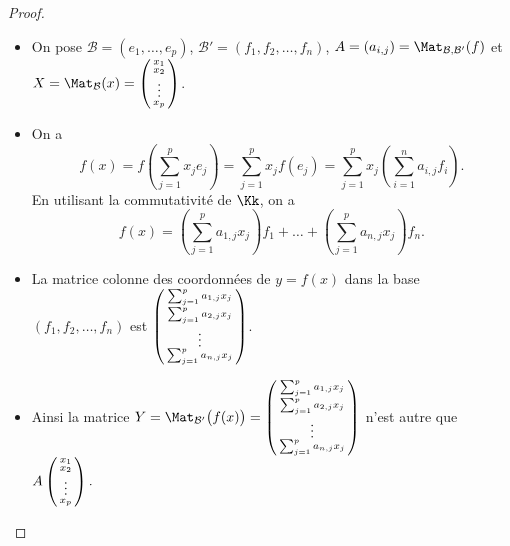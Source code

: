 \documentclass[class=report,crop=false]{standalone}
\begin{document}
\begin{proof}~
\begin{itemize}
  \item On pose
  $\mathcal{B}=(e_1, \ldots ,e_p)$,
  $\mathcal{B}'=(f_1, f_2, \ldots,f_n)$,
  $A = (a_{i,j}) = \Mat_{\mathcal{B},\mathcal{B}'} (f)$ et
$X = \Mat_{\mathcal{B}} (x)
= \left(\begin{smallmatrix}x_1\cr x_2\cr \vdots \cr x_p \end{smallmatrix}\right)$.


  \item On a $$f (x)=f \left ( {\sum_{j=1}^px_je_j}\right )=
\sum_{j=1}^px_jf (e_j)=
\sum_{j=1}^px_j\left (\sum_{i=1}^na_{i,j}f_{i}\right ).$$
En utilisant la commutativité de $\Kk$, on a
$$f (x)=
\left (\sum_{j=1}^p a_{1,j}x_j \right ) f_1+ \dots +
\left (\sum_{j=1}^p a_{n,j}x_j \right ) f_n.$$

  \item La matrice colonne des coordonnées de $y=f(x)$ dans la base
$(f_1, f_2,\dots ,f_n)$ est
$\left(\begin{smallmatrix}
\sum_{j=1}^p a_{1,j}x_j\cr
\sum_{j=1}^p a_{2,j}x_j\cr
\vdots \cr
\sum_{j=1}^p a_{n,j}x_j
\end{smallmatrix}\right)$.

  \item Ainsi la matrice
$Y = \Mat_{\mathcal{B}'} \big(f (x) \big)
=\left(\begin{smallmatrix}
\sum_{j=1}^p a_{1,j}x_j\cr
\sum_{j=1}^p a_{2,j}x_j\cr
\vdots \cr
\sum_{j=1}^p a_{n,j}x_j
\end{smallmatrix}\right)$
n'est autre que $A
\left(\begin{smallmatrix} x_1\cr x_2\cr \vdots \cr x_p \end{smallmatrix}\right).$
\end{itemize}





\end{proof}
\end{document}
